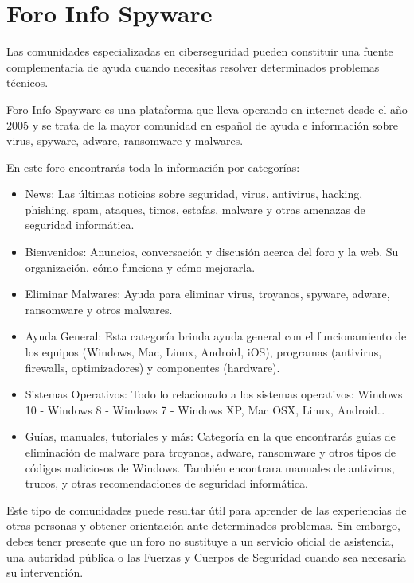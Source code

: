 \documentclass[
  spanish,
  a4paper,
  openany]{book}
\begin{document}
\section{Foro Info Spyware}\label{foro-info-spyware}

Las comunidades especializadas en ciberseguridad pueden constituir una fuente complementaria de ayuda cuando necesitas resolver determinados problemas técnicos.

\href{https://forospyware.com/}{Foro Info Spayware} es una plataforma que lleva operando en internet desde el año 2005 y se trata de la mayor comunidad en español de ayuda e información sobre virus, spyware, adware, ransomware y malwares.

En este foro encontrarás toda la información por categorías:

\begin{itemize}
\item
  News: Las últimas noticias sobre seguridad, virus, antivirus, hacking, phishing, spam, ataques, timos, estafas, malware y otras amenazas de seguridad informática.
\item
  Bienvenidos: Anuncios, conversación y discusión acerca del foro y la web. Su organización, cómo funciona y cómo mejorarla.
\item
  Eliminar Malwares: Ayuda para eliminar virus, troyanos, spyware, adware, ransomware y otros malwares.
\item
  Ayuda General: Esta categoría brinda ayuda general con el funcionamiento de los equipos (Windows, Mac, Linux, Android, iOS), programas (antivirus, firewalls, optimizadores) y componentes (hardware).
\item
  Sistemas Operativos: Todo lo relacionado a los sistemas operativos: Windows 10 - Windows 8 - Windows 7 - Windows XP, Mac OSX, Linux, Android\ldots{}
\item
  Guías, manuales, tutoriales y más: Categoría en la que encontrarás guías de eliminación de malware para troyanos, adware, ransomware y otros tipos de códigos maliciosos de Windows. También encontrara manuales de antivirus, trucos, y otras recomendaciones de seguridad informática.
\end{itemize}

Este tipo de comunidades puede resultar útil para aprender de las experiencias de otras personas y obtener orientación ante determinados problemas. Sin embargo, debes tener presente que un foro no sustituye a un servicio oficial de asistencia, una autoridad pública o las Fuerzas y Cuerpos de Seguridad cuando sea necesaria su intervención.
\end{document}
